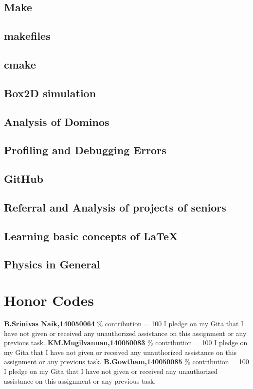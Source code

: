 \documentclass{article}
\begin{document}
    \subsection{Make}
    \subsection{makefiles}
    \subsection{cmake}
    \subsection{Box2D simulation}
    \subsection{Analysis of Dominos}
    \subsection{Profiling and Debugging Errors}
    \subsection{GitHub}
    \subsection{Referral and Analysis of projects of seniors \cite{saikiran} \cite{amangoel}} 
    \subsection{Learning basic concepts of \LaTeX}
    \subsection{Physics in General}

\section{Honor Codes} \label{Honor Codes}
    \textbf{B.Srinivas Naik,140050064} \% contribution = 100 \newline
    \indent\indent I pledge on my Gita that I have not given or received any unauthorized assistance on this assignment or any previous task. \newline
    \indent \textbf{KM.Mugilvannan,140050083} \% contribution = 100 \newline 
    \indent\indent I pledge on my Gita that I have not given or received any unauthorized assistance on this assignment or any previous task.\newline 
    \indent \textbf{B.Gowtham,140050085} \% contribution = 100 \newline
    \indent\indent I pledge on my Gita that I have not given or received any unauthorized assistance on this assignment or any previous task.

   
\end{document}
